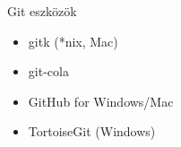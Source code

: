 
\begin{frame}{Git eszközök}
    \begin{itemize}
        \item gitk (*nix, Mac)
        \item git-cola
        \item GitHub for Windows/Mac
        \item TortoiseGit (Windows)
    \end{itemize}
\end{frame}

